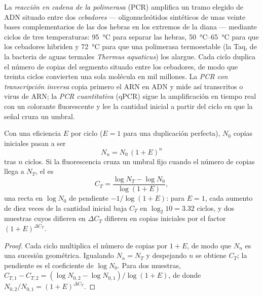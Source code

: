 \begin{definition}\label{def:b3:genetic-engineering:pcr}
La \emph{reacción en cadena de la polimerasa} (PCR) amplifica un tramo
elegido de ADN situado entre dos \emph{cebadores} --- oligonucleótidos
sintéticos de unas veinte bases complementarios de las dos hebras en los
extremos de la diana --- mediante ciclos de tres temperaturas:
\qty{95}{\celsius} para separar las hebras,
\qtyrange{50}{65}{\celsius} para que los cebadores hibriden y
\qty{72}{\celsius} para que una polimerasa termoestable (la Taq, de la
bacteria de aguas termales \emph{Thermus aquaticus}) los alargue. Cada
ciclo duplica el número de copias del segmento situado entre los
cebadores, de modo que treinta ciclos convierten una sola molécula en mil
millones. La \emph{PCR con transcripción inversa} copia primero el ARN en
ADN y mide así transcritos o virus de ARN; la \emph{PCR cuantitativa}
(qPCR) sigue la amplificación en tiempo real con un colorante fluorescente
y lee la cantidad inicial a partir del ciclo en que la señal cruza un
umbral.
\end{definition}

\begin{theorem}\label{thm:b3:genetic-engineering:pcr}
Con una eficiencia $E$ por ciclo ($E = 1$ para una duplicación perfecta),
$N_{0}$ copias iniciales pasan a ser
\[
N_{n} = N_{0}\,(1 + E)^{n}
\]
tras $n$ ciclos. Si la fluorescencia cruza un umbral fijo cuando el
número de copias llega a $N_{T}$, el \emph{} es
\[
C_{T} = \frac{\log N_{T} - \log N_{0}}{\log(1 + E)},
\]
una recta en $\log N_{0}$ de pendiente $-1/\log(1+E)$: para $E = 1$, cada
aumento de diez veces de la cantidad inicial baja $C_{T}$ en
$\log_{2} 10 = 3.32$ ciclos, y dos muestras cuyos  difieren
en $\Delta C_{T}$ difieren en copias iniciales por el factor
$(1 + E)^{\Delta C_{T}}$.
\end{theorem}
\begin{proof}
Cada ciclo multiplica el número de copias por $1 + E$, de modo que
$N_{n}$ es una sucesión geométrica. Igualando $N_{n} = N_{T}$ y
despejando $n$ se obtiene $C_{T}$; la pendiente es el coeficiente de
$\log N_{0}$. Para dos muestras,
$C_{T,1} - C_{T,2} = (\log N_{0,2} - \log N_{0,1})/\log(1+E)$, de donde
$N_{0,2}/N_{0,1} = (1+E)^{\Delta C_{T}}$.
\end{proof}

